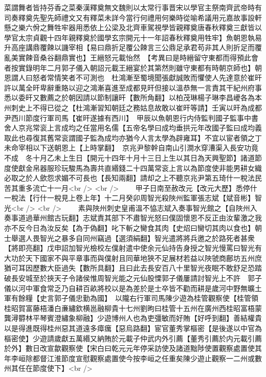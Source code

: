 菜謂舞者皆持芬香之菜秦漢釋奠無文魏則以太常行事晋宋以學官主祭南齊武帝時有司奏釋奠先聖先師禮文又有釋菜未詳今當行何禮用何樂時從喻希議用元嘉故事設軒懸之樂六佾之舞牲牢器用悉依上公梁及北齊車駕視學皆親釋奠唐春秋釋奠三獻皆以學官太宗貞觀十四年親釋奠於國學玄宗開元十一年詔春秋釋奠用牲牢】魚朝恩執易升高座講鼎覆餗以譏宰相【易曰鼎折足覆公餗言三公鼎足承君苟非其人則折足而覆亂美實餗音桑谷翻鼎實也】王縉怒元載怡然　【考異曰是時縉留守東都而得預此會者按實錄明年二月郭子儀入朝詔元載王縉宴於其第然則雖守東都有時朝京師也】朝恩謂人曰怒者常情笑者不可測也　杜鴻漸至蜀境聞張獻誠敗而懼使人先達意於崔旰許以萬全旰卑辭重賂以迎之鴻漸喜進至成都見旰但接以溫恭無一言責其干紀州府事悉以委旰又數薦之於朝因請以節制讓旰【數所角翻】以柏茂琳楊子琳李昌巙各為本州刺史上不得已從之【杜鴻漸習知朝廷之務姑息故敢以崔旰等請】壬寅以旰為成都尹西川節度行軍司馬【崔旰遂據有西川】　甲辰以魚朝恩行内侍監判國子監事中書舍人京兆常衮上言成均之任當用名儒【五帝名學曰成均垂拱元年改國子監曰成均義取此也尋復其舊常衮謂國子監為成均亦猶今人言太學為辟雍耳】不宜以宦者領之丁未命宰相以下送朝恩上【上時掌翻】　京兆尹黎幹自南山引澗水穿漕渠入長安功竟不成　冬十月乙未上生日【開元十四年十月十三日上生以其日為天興聖節】諸道節度使獻金帛器服珍玩駿馬為壽共直緡錢二十四萬常衮上言以為節度使非能男耕女織必取之於人歛怨求媚不可長也【長知兩翻】請却之上不聽京兆尹第五琦什一稅法民苦其重多流亡十一月<br />
<br />
　　甲子日南至赦改元【改元大歷】悉停什一稅法【行什一稅見上卷上年】十二月癸卯周智光殺陜州監軍張志斌【斌音彬】智光<br />
<br />
　　素與陜州刺史皇甫溫不恊志斌入奏事智光館之【自陜州入奏事道過華州館古玩翻】志斌責其部下不肅智光怒曰僕固懷恩不反正由汝輩激之我亦不反今日為汝反矣【為于偽翻】叱下斬之臠食其肉【史炤曰臠切其肉以食也】朝士舉選人畏智光之暴多自同州竊過【選須絹翻】智光遣將將兵邀之於路死者甚衆【將即亮翻】戊申詔加智光檢校左僕射遣中使余元仙持告身授之智光慢罵曰智光有大功於天下國家不與平章事而與僕射且同華地狹不足展材若益以陜虢商鄜坊五州庶猶可耳因歷數大臣過失【數所具翻】且曰此去長安百八十里智光夜眠不敢舒足恐踏破長安城至於挾天子令諸侯惟周智光能之元仙股慄郭子儀屢請討智光上不許　郭子儀以河中軍食常乏乃自耕百畝將校以是為差於是士卒皆不勸而耕是歲河中野無曠土軍有餘糧【史言郭子儀忠勤為國】　以隴右行軍司馬陳少遊為桂管觀察使【桂管領桂昭賀富藤梧潘白亷繡欽横邕融柳貴十七州劉昫曰桂管十五州在廣州西桂昭富梧蒙龔潯欎林平琴賓澄繡象柳融】少遊博州人也為吏彊敏而好賄【好呼到翻】善結權貴以是得進既得桂州惡其道遠多瘴癘【惡烏路翻】宦官董秀掌樞密【是後遂以中官為樞密使】少遊請歲獻五萬緡又納賄於元載子仲武内外引薦【董秀引薦於内元載引薦於外】數日改宣歙觀察使【宋白曰乾元元年停采訪使及諸道黜陟使置觀察處置使其年李峘除都督江淮節度宣慰觀察處置使今按李峘之任重矣陳少遊止觀察一二州或數州其任在節度使下】<br />
